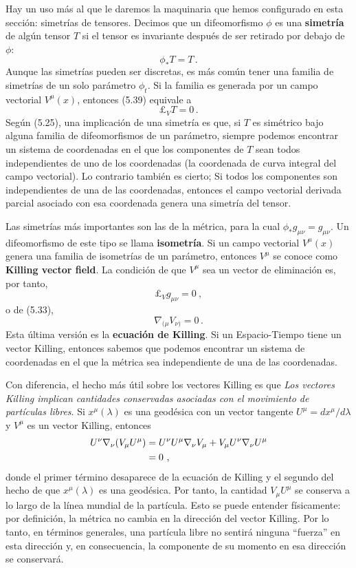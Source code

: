 \documentclass[11pt,b5paper,openany,twoside]{book}
\newcommand{\mn}{{\mu\nu}}
\def\lie{\pounds}
\begin{document}
Hay un uso más al que le daremos la maquinaria que hemos configurado en esta sección: simetrías de tensores.
Decimos que un difeomorfismo $\phi$ es una {\bf simetría} de algún tensor $T$ si el tensor es invariante después de ser retirado por debajo de $\phi$:
\begin{equation}
\phi_*T = T\,.\label{5.39}
\end{equation}
Aunque las simetrías pueden ser discretas, es más común tener una familia de simetrías de un solo parámetro $\phi_t$.
Si la familia es generada por un campo vectorial $V^\mu(x)$, entonces (5.39) equivale a
\begin{equation}
\lie_V T=0\,.\label{5.40}
\end{equation}
Según (5.25), una implicación de una simetría es que, si $T$ es simétrico bajo alguna familia de difeomorfismos de un parámetro, siempre podemos encontrar un sistema de coordenadas en el que los componentes de $T$ sean todos independientes de uno de los coordenadas (la coordenada de curva integral del campo vectorial).
Lo contrario también es cierto; Si todos los componentes son independientes de una de las coordenadas, entonces el campo vectorial derivada parcial asociado con esa coordenada genera una simetría del tensor.

Las simetrías más importantes son las de la métrica, para la cual $\phi_*g_\mn = g_\mn$.
Un difeomorfismo de este tipo se llama {\bf isometría}.
Si un campo vectorial $V^\mu(x)$ genera una familia de isometrías de un parámetro, entonces $V^\mu$ se conoce como {\bf Killing vector field}.
La condición de que $V^\mu$ sea un vector de eliminación es, por tanto,
\begin{equation}
\lie_V g_\mn=0\ ,\label{5.41}
\end{equation}
o de (5.33),
\begin{equation}
\nabla_{(\mu}V_{\nu)}=0\,.\label{5.42}
\end{equation}
Esta última versión es la {\bf ecuación de Killing}.
Si un Espacio-Tiempo tiene un vector Killing, entonces sabemos que podemos encontrar un sistema de coordenadas en el que la métrica sea independiente de una de las coordenadas.

Con diferencia, el hecho más útil sobre los vectores Killing es que {\it Los vectores Killing implican cantidades conservadas asociadas con el movimiento de partículas libres}.
Si $x^\mu(\lambda)$ es una geodésica con un vector tangente $U^\mu=dx^\mu/d\lambda$ y $V^\mu$ es un vector Killing, entonces
\begin{align}
U^\nu\nabla_\nu(V_\mu U^\mu) &=  U^\nu U^\mu \nabla_\nu V_\mu
+V_\mu U^\nu \nabla_\nu U^\mu  \notag \\
&=  0\ ,\label{5.43}
\end{align}
donde el primer término desaparece de la ecuación de Killing y el segundo del hecho de que $x^\mu(\lambda)$ es una geodésica.
Por tanto, la cantidad $V_\mu U^\mu$ se conserva a lo largo de la línea mundial de la partícula.
Esto se puede entender físicamente: por definición, la métrica no cambia en la dirección del vector Killing.
Por lo tanto, en términos generales, una partícula libre no sentirá ninguna ``fuerza'' en esta dirección y, en consecuencia, la componente de su momento en esa dirección se conservará.
\end{document}
